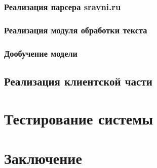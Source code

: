 \documentclass[PI, VKR]{HSEUniversity}
\begin{document}
\subsection{Реализация парсера sravni.ru}
\label{sec:orge0716de}
\subsection{Реализация модуля обработки текста}
\label{sec:org75df4f2}
\subsection{Дообучение модели}
\label{sec:orga635021}
\section{Реализация клиентской части}
\label{sec:org56fa2c7}
\chapter{Тестирование системы}
\label{sec:org9319cf3}
\chapter*{Заключение}
\label{sec:org9bc67be}
\putbibliography
\appendix
\end{document}
